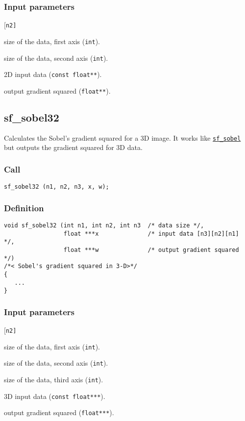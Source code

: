 \subsubsection*{Input parameters}
\begin{desclist}{\tt }{\quad}[\tt n2]
   \setlength\itemsep{0pt}
   \item[n1] size of the data, first axis (\texttt{int}).  
   \item[n2] size of the data, second axis (\texttt{int}). 
   \item[x]  2D input data (\texttt{const float**}).  
   \item[w]  output gradient squared (\texttt{float**}).  
\end{desclist}




\subsection{{sf\_sobel32}}
Calculates the Sobel's gradient squared for a 3D image. It works like \hyperref[sec:sf_sobel]{\texttt{sf\_sobel}} but outputs the gradient squared for 3D data.

\subsubsection*{Call}
\begin{verbatim}sf_sobel32 (n1, n2, n3, x, w);\end{verbatim}

\subsubsection*{Definition}
\begin{verbatim}
void sf_sobel32 (int n1, int n2, int n3  /* data size */, 
                 float ***x              /* input data [n3][n2][n1] */, 
                 float ***w              /* output gradient squared */)
/*< Sobel's gradient squared in 3-D>*/
{
   ...
}
\end{verbatim}

\subsubsection*{Input parameters}
\begin{desclist}{\tt }{\quad}[\tt n2]
   \setlength\itemsep{0pt}
   \item[n1]	 size of the data, first axis (\texttt{int}).  
   \item[n2]	 size of the data, second axis (\texttt{int}).  
   \item[n3]	 size of the data, third axis (\texttt{int}). 
   \item[x]  3D input data (\texttt{const float***}).  
   \item[w]  output gradient squared (\texttt{float***}).  
\end{desclist}



